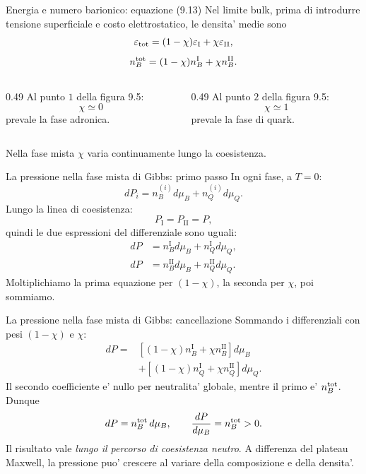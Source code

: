 \begin{frame}{Energia e numero barionico: equazione (9.13)}
\small
Nel limite bulk, prima di introdurre tensione superficiale
e costo elettrostatico, le densita' medie sono
\[
\varepsilon_{\rm tot}=(1-\chi)\varepsilon_{\mathrm I}
+\chi\varepsilon_{\mathrm{II}},
\]
\[
n_B^{\rm tot}=(1-\chi)n_B^{\mathrm I}
+\chi n_B^{\mathrm{II}}.
\]
\begin{columns}[T,onlytextwidth]
\begin{column}{0.49\textwidth}
Al punto $1$ della figura 9.5:
\[
\chi\simeq0
\]
prevale la fase adronica.
\end{column}
\begin{column}{0.49\textwidth}
Al punto $2$ della figura 9.5:
\[
\chi\simeq1
\]
prevale la fase di quark.
\end{column}
\end{columns}
\medskip
Nella fase mista $\chi$ varia continuamente lungo la coesistenza.
\end{frame}

\begin{frame}{La pressione nella fase mista di Gibbs: primo passo}
\small
In ogni fase, a $T=0$:
\[
dP_i=n_B^{(i)}d\mu_B+n_Q^{(i)}d\mu_Q.
\]
Lungo la linea di coesistenza:
\[
P_{\mathrm I}=P_{\mathrm{II}}=P,
\]
quindi le due espressioni del differenziale sono uguali:
\[
\begin{aligned}
dP&=n_B^{\mathrm I}d\mu_B+n_Q^{\mathrm I}d\mu_Q,\\
dP&=n_B^{\mathrm{II}}d\mu_B+n_Q^{\mathrm{II}}d\mu_Q.
\end{aligned}
\]
Moltiplichiamo la prima equazione per $(1-\chi)$,
la seconda per $\chi$, poi sommiamo.
\end{frame}

\begin{frame}{La pressione nella fase mista di Gibbs: cancellazione}
\footnotesize
Sommando i differenziali con pesi $(1-\chi)$ e $\chi$:
\[
\begin{aligned}
dP={}&[(1-\chi)n_B^{\mathrm I}+\chi n_B^{\mathrm{II}}]d\mu_B\\
&+[(1-\chi)n_Q^{\mathrm I}+\chi n_Q^{\mathrm{II}}]d\mu_Q.
\end{aligned}
\]
Il secondo coefficiente e' nullo per neutralita' globale, mentre
il primo e' $n_B^{\rm tot}$. Dunque
\[
dP=n_B^{\rm tot}\,d\mu_B,
\qquad
\frac{dP}{d\mu_B}=n_B^{\rm tot}>0.
\]
\medskip
Il risultato vale \emph{lungo il percorso di coesistenza neutro}.
A differenza del plateau Maxwell, la pressione puo' crescere
al variare della composizione e della densita'.
\end{frame}

